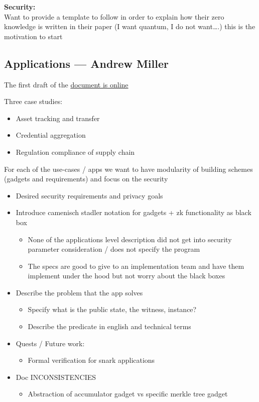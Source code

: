 {\bfseries Security:}
\\Want to provide a template to follow in order to explain how their zero knowledge is written in
their paper (I want quantum, I do not want….) this is the motivation to start



\subsection{Applications --- Andrew Miller}
\label{sec:zcon0:session1-overview:apps}

The first draft of the \href{https://zkproof.org/ZKProof\%20Applications\%20Draft\%200.1.pdf}{document is online}

Three case studies:
\begin{itemize}[topsep=0pt,label={- }]
\item Asset tracking and transfer
\item Credential aggregation
\item Regulation compliance of supply chain
\end{itemize}


For each of the use-cases / apps we want to have modularity of building schemes (gadgets and
requirements) and focus on the security
\begin{itemize}[label={- }]
\item Desired security requirements and privacy goals
\item Introduce camenisch stadler notation for gadgets + zk functionality as black box
		\begin{itemize}[label={- }]
		\item None of the applications level description did not get into security parameter
					consideration / does not specify the program
		\item The specs are good to give to an implementation team and have them implement
					under the hood but not worry about the black boxes
		\end{itemize}
\item Describe the problem that the app solves
    \begin{itemize}[label={- }]
		\item Specify what is the public state, the witness, instance?
		\item Describe the predicate in english and technical terms
		\end{itemize}
\item Quests / Future work:
    \begin{itemize}[label={- }]
		\item Formal verification for snark applications
		\end{itemize}
\item Doc INCONSISTENCIES
    \begin{itemize}[label={- }]
    \item Abstraction of accumulator gadget vs specific merkle tree gadget
    \end{itemize}
\end{itemize}


